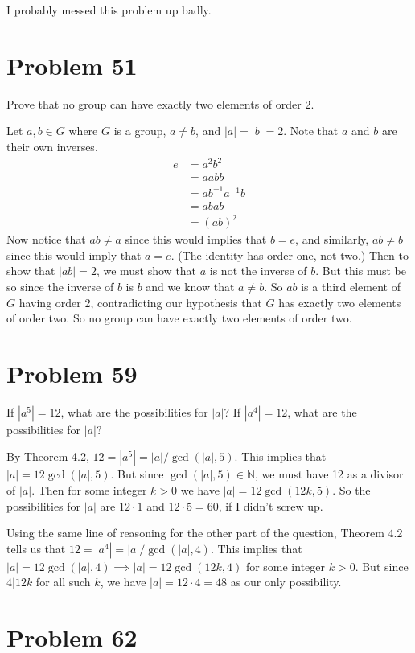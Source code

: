 \documentclass{article}
\begin{document}
I probably messed this problem up badly.

\section*{Problem 51}

Prove that no group can have exactly two elements of order 2.

Let $a,b\in G$ where $G$ is a group, $a\neq b$, and $|a|=|b|=2$.  Note that
$a$ and $b$ are their own inverses.
\begin{align*}
e &= a^2b^2 \\
 &= aabb \\
 &= ab^{-1}a^{-1}b \\
 &= abab \\
 &= (ab)^2
\end{align*}
Now notice that $ab\neq a$ since this would implies that $b=e$, and similarly,
$ab\neq b$ since this would imply that $a=e$.  (The identity has order one, not two.)
Then to show that $|ab|=2$, we must show that $a$ is not the inverse of $b$.
But this must be so since the inverse of $b$ is $b$ and we know that $a\neq b$.
So $ab$ is a third element of $G$ having order 2, contradicting our hypothesis that
$G$ has exactly two elements of order two.  So no group can have exactly two elements
of order two.

\section*{Problem 59}

If $|a^5|=12$, what are the possibilities for $|a|$?  If $|a^4|=12$, what
are the possibilities for $|a|$?

By Theorem 4.2, $12=|a^5|=|a|/\gcd(|a|,5)$.  This implies that
$|a|=12\gcd(|a|,5)$.  But since $\gcd(|a|,5)\in\mathbb{N}$, we must
have 12 as a divisor of $|a|$.  Then for some integer $k>0$ we have
$|a|=12\gcd(12k,5)$.  So the possibilities for $|a|$ are $12\cdot 1$ and $12\cdot 5=60$,
if I didn't screw up.

Using the same line of reasoning for the other part of the question,
Theorem 4.2 tells us that $12=|a^4|=|a|/\gcd(|a|,4)$.  This implies that
$|a|=12\gcd(|a|,4)\implies |a|=12\gcd(12k,4)$ for some integer $k>0$.
But since $4|12k$ for all such $k$, we have $|a|=12\cdot 4 = 48$ as our
only possibility.

\section*{Problem 62}
\end{document}
